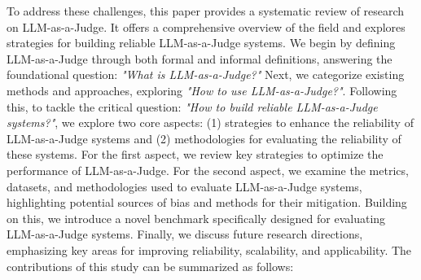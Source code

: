 To address these challenges, this paper provides a systematic review of research on LLM-as-a-Judge. It offers a comprehensive overview of the field and explores strategies for building reliable LLM-as-a-Judge systems. We begin by defining LLM-as-a-Judge through both formal and informal definitions, answering the foundational question: \textit{"What is LLM-as-a-Judge?"} Next, we categorize existing methods and approaches, exploring \textit{"How to use LLM-as-a-Judge?"}.
Following this, to tackle the critical question: \textit{"How to build reliable LLM-as-a-Judge systems?"}, we explore two core aspects: (1) strategies to enhance the reliability of LLM-as-a-Judge systems and (2) methodologies for evaluating the reliability of these systems.
For the first aspect, we review key strategies to optimize the performance of LLM-as-a-Judge. For the second aspect, we examine the metrics, datasets, and methodologies used to evaluate LLM-as-a-Judge systems, highlighting potential sources of bias and methods for their mitigation.
Building on this, we introduce a novel benchmark specifically designed for evaluating LLM-as-a-Judge systems. Finally, we discuss future research directions, emphasizing key areas for improving reliability, scalability, and applicability. The contributions of this study can be summarized as follows:
